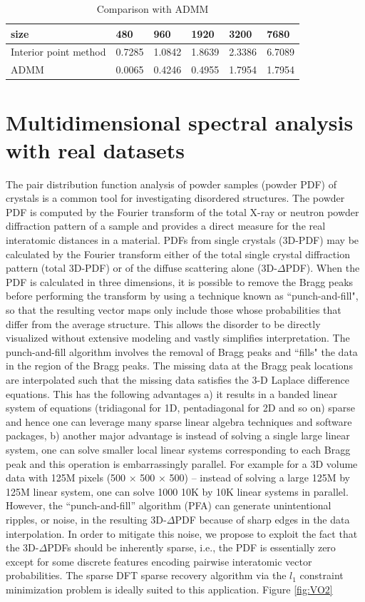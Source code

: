 \documentclass[final,onefignum,onetabnum]{siamart190516}
\newcounter{example}
\begin{document}
\begin{table}[H]
\caption{Comparison with ADMM}
\begin{tabular}{|l|l|l|l|l|l|}
\hline
size                  & 480    & 960    & 1920   & 3200   & 7680   \\ \hline
Interior point method & 0.7285 & 1.0842 & 1.8639 & 2.3386 & 6.7089 \\ \hline
ADMM                  & 0.0065 & 0.4246 & 0.4955 & 1.7954 & 1.7954 \\ \hline
\end{tabular}
\end{table}
\section{Multidimensional spectral analysis with real datasets}\label{sec:real_datasets}
The pair distribution function analysis of powder samples (powder PDF) of crystals is a common tool for investigating disordered structures. The powder PDF is computed by the Fourier transform of the total X-ray or neutron powder diffraction pattern of a sample and provides a direct measure for the real interatomic distances in a material. PDFs from single crystals (3D-PDF) may be calculated by the Fourier transform either of the total single crystal diffraction pattern (total 3D-PDF) or of the diffuse scattering alone (3D-$\Delta$PDF). When the PDF is calculated in three dimensions, it is possible to remove the Bragg peaks before performing the transform by using a technique known as ``punch-and-fill", so that the resulting vector maps only
include those whose probabilities that differ from the average structure. This allows the disorder to be directly visualized without extensive modeling and vastly simplifies interpretation. The punch-and-fill algorithm involves the removal of Bragg peaks and ``fills" the data in the region of the Bragg peaks. The missing data at the Bragg peak locations are interpolated such that the missing data satisfies the 3-D Laplace difference equations. This has the following advantages  a) it results in a banded linear system of equations (tridiagonal for 1D, pentadiagonal for 2D and so on) sparse and hence one can leverage many sparse linear algebra techniques and software packages, b) another major advantage is instead of solving a single large linear system, one can solve smaller local linear systems corresponding to each Bragg peak and this operation is embarrassingly parallel. For example for a 3D volume data with 125M pixels (500 $\times$ 500 $\times$ 500) -- instead of solving a large 125M by 125M linear system, one can solve 1000 10K by 10K linear systems in parallel. However, the “punch-and-fill” algorithm (PFA) can generate unintentional ripples, or noise, in the resulting 3D-$\Delta$PDF because of sharp edges in the data interpolation. In order to mitigate this noise, we propose to exploit the fact that the 3D-$\Delta$PDFs should be inherently sparse, i.e., the PDF is essentially zero except for some discrete features encoding pairwise interatomic vector probabilities. The sparse DFT sparse recovery algorithm via the $l_1$ constraint minimization problem is ideally suited to this application. Figure \ref{fig:VO2}
\end{document}

